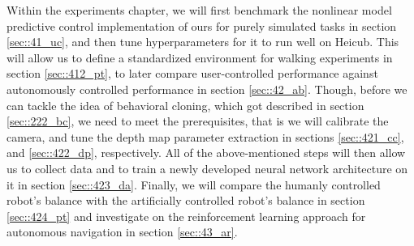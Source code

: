 \label{sec::4_ex}
Within the experiments chapter, we will first benchmark the nonlinear model predictive control implementation of ours for purely simulated tasks in section \ref{sec::41_uc}, and then tune hyperparameters for it to run well on Heicub. This will allow us to define a standardized environment for walking experiments in section \ref{sec::412_pt}, to later compare user-controlled performance against autonomously controlled performance in section \ref{sec::42_ab}. Though, before we can tackle the idea of behavioral cloning, which got described in section \ref{sec::222_bc}, we need to meet the prerequisites, that is we will calibrate the camera, and tune the depth map parameter extraction in sections \ref{sec::421_cc}, and \ref{sec::422_dp}, respectively. All of the above-mentioned steps will then allow us to collect data and to train a newly developed neural network architecture on it in section \ref{sec::423_da}. Finally, we will compare the humanly controlled robot's balance with the artificially controlled robot's balance in section \ref{sec::424_pt} and investigate on the reinforcement learning approach for autonomous navigation in section \ref{sec::43_ar}.